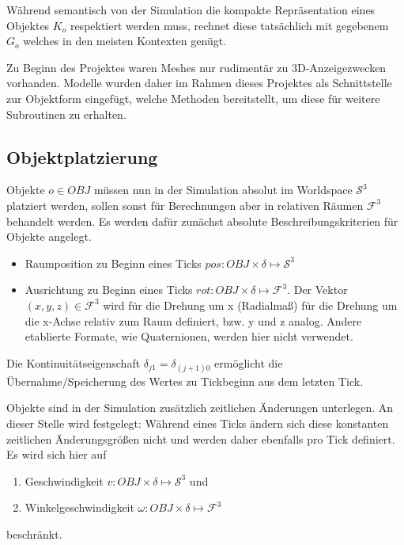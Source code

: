 Während semantisch von der Simulation die kompakte Repräsentation eines Objektes $K_o$ respektiert werden muss, rechnet diese tatsächlich mit gegebenem $G_o$ welches in den meisten Kontexten genügt.

Zu Beginn des Projektes waren Meshes nur rudimentär zu 3D-Anzeigezwecken vorhanden. Modelle wurden daher im Rahmen dieses Projektes als Schnittstelle zur Objektform eingefügt, welche Methoden bereitstellt, um diese für weitere Subroutinen zu erhalten.

\subsection{Objektplatzierung}
\label{sec:objects_sim}

Objekte $o\in OBJ$ müssen nun in der Simulation absolut im Worldspace $\mathcal{S}^3$ platziert werden, sollen sonst für Berechnungen aber in relativen Räumen $\mathcal{F}^3$ behandelt werden. Es werden dafür zunächst absolute Beschreibungskriterien für Objekte angelegt.
\begin{itemize}
\item Raumposition zu Beginn eines Ticks $pos : OBJ \times \delta \mapsto \mathcal{S}^3$
\item Ausrichtung zu Beginn eines Ticks $rot : OBJ \times \delta \mapsto \mathcal{F}^3$. Der Vektor $(x, y, z) \in\mathcal{F}^3$ wird für die Drehung um x (Radialmaß) für die Drehung um die x-Achse relativ zum Raum definiert, bzw. y und z analog. Andere etablierte Formate, wie Quaternionen, werden hier nicht verwendet.
\end{itemize}
Die Kontinuitätseigenschaft $\delta_{j1} = \delta_{(j+1)0}$ ermöglicht die Übernahme/Speicherung des Wertes zu Tickbeginn aus dem letzten Tick.

Objekte sind in der Simulation zusätzlich zeitlichen Änderungen unterlegen.
An dieser Stelle wird festgelegt: Während eines Ticks ändern sich diese konstanten zeitlichen Änderungsgrößen nicht und werden daher ebenfalls pro Tick definiert.\\
 Es wird sich hier auf
\begin{enumerate}
\item Geschwindigkeit $v: OBJ \times \delta \mapsto \mathcal{S}^3$  und
\item Winkelgeschwindigkeit $\omega : OBJ \times \delta \mapsto \mathcal{F}^3 $
\end{enumerate}
beschränkt.

